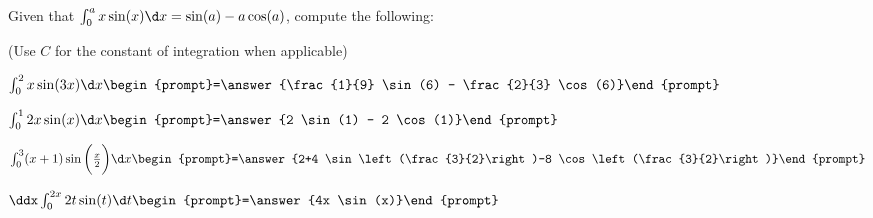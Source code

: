 \documentclass{ximera}
\author{Jim Talamo}
\begin{document}
\begin{exercise}
Given that $ \int_0^a x \sin(x) \d x = \sin(a)-a \cos(a)$, compute the following:

\begin{prompt} (Use $C$ for the constant of integration when applicable) \end{prompt}

$ \int_0^2 x \sin(3x) \d x \begin{prompt}=\answer{\frac{1}{9} \sin(6) - \frac{2}{3} \cos(6)}\end{prompt}$


$ \int_0^1 2x \sin(x) \d x \begin{prompt}=\answer{2 \sin(1) - 2 \cos(1)}\end{prompt}$

$ \int_0^3 (x+1) \sin\bigg(\frac{x}{2}\bigg) \d x \begin{prompt}=\answer{2+4 \sin\left(\frac{3}{2}\right)-8 \cos\left(\frac{3}{2}\right)}\end{prompt}$

$\ddx  \int_0^{2x} 2t \sin(t) \d t  \begin{prompt}=\answer{4x \sin(x)}\end{prompt}$

\end{exercise}
\end{document}
